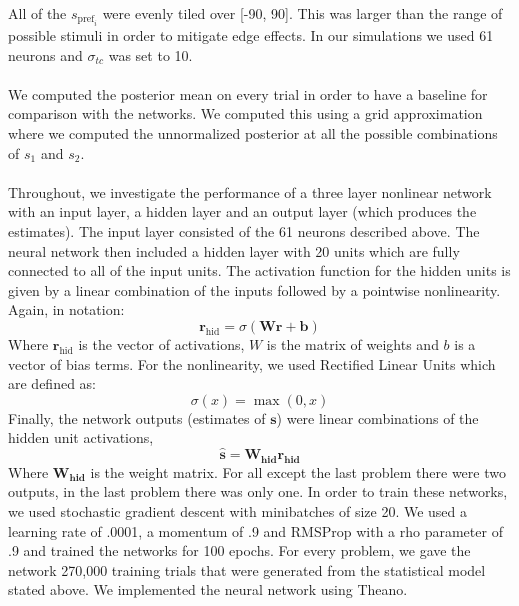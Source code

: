 \documentclass{article} %
\begin{document}
\\
All of the $s_{\text{pref}_i}$ were evenly tiled over [-90, 90]. This was larger than the range of possible stimuli in order to mitigate edge effects. In our simulations we used 61 neurons and $\sigma_{tc}$ was set to 10.
\\
\\
We computed the posterior mean on every trial in order to have a baseline for comparison with the networks. We computed this using a grid approximation where we computed the unnormalized posterior at all the possible combinations of $s_1$ and $s_2$.
\\
\\
Throughout, we investigate the performance of a three layer nonlinear network with an input layer, a hidden layer and an output layer (which produces the estimates). The input layer consisted of the 61 neurons described above. The neural network then included a hidden layer with 20 units which are fully connected to all of the input units. The activation function for the hidden units is given by a linear combination of the inputs followed by a pointwise nonlinearity. Again, in notation:
\begin{equation}
	\mathbf{r}_{\text{hid}} = \sigma(\mathbf{Wr + b})
\end{equation}
Where $\mathbf{r}_{\text{hid}}$ is the vector of activations, $W$ is the matrix of weights and $b$ is a vector of bias terms. For the nonlinearity, we used Rectified Linear Units \cite{NairH10} which are defined as:
\begin{equation}
	\sigma(x) = \max(0, x)
\end{equation}
Finally, the network outputs (estimates of $\mathbf{s}$) were linear combinations of the hidden unit activations,  
\begin{equation}
	\mathbf{\hat{s}} = \mathbf{W_{\text{hid}} r_{\text{hid}}}
\end{equation}
Where $\mathbf{W_{\text{hid}}}$ is the weight matrix. For all except the last problem there were two outputs, in the last problem there was only one. 
In order to train these networks, we used stochastic gradient descent with minibatches of size 20. We used a learning rate of .0001, a momentum of .9 \cite{Sutskever2013} and RMSProp \cite{Tieleman2012} with a rho parameter of .9 and trained the networks for 100 epochs. For every problem, we gave the network 270,000 training trials that were generated from the statistical model stated above. We implemented the neural network using Theano.
\\
\\
\end{document}
